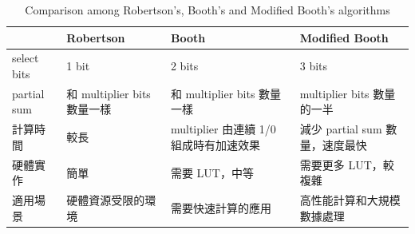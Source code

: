\documentclass[12pt]{article}
\begin{document}
\begin{table}[h]
    \centering
    \caption{Comparison among Robertson's, Booth's and Modified Booth's algorithms}
    \begin{tabular}{|p{}|p{}|p{}|p{}|} \hline
     & Robertson & Booth & Modified Booth \\ \hline
    select bits & 1 bit & 2 bits & 3 bits \\ \hline
    partial sum & 和 multiplier bits 數量一樣 & 和 multiplier bits 數量一樣 & multiplier bits 數量的一半 \\ \hline
    計算時間 & 較長 &  multiplier 由連續 1/0 組成時有加速效果  & 減少 partial sum 數量，速度最快 \\ \hline
    硬體實作 & 簡單 & 需要 LUT，中等 & 需要更多 LUT，較複雜 \\ \hline
    適用場景 & 硬體資源受限的環境 & 需要快速計算的應用 & 高性能計算和大規模數據處理 \\ \hline
    \end{tabular}
    \label{tab:algo_cmp}
\end{table}

\end{document}
